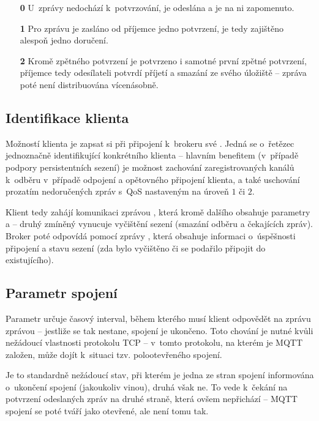 \begin{enumerate}
    \item[\textbf{0}] U~zprávy nedochází k~potvrzování, je odeslána a je na ni zapomenuto.
    \item[\textbf{1}] Pro zprávu je zasláno od příjemce jedno potvrzení, je tedy zajištěno alespoň jedno doručení.
    \item[\textbf{2}] Kromě zpětného potvrzení je potvrzeno i samotné první zpětné potvrzení, příjemce tedy
    odesílateli potvrdí příjetí a smazání ze svého úložiště -- zpráva poté není distribuována vícenásobně.
\end{enumerate}

\subsection{Identifikace klienta }\label{subsec:identifikace-klienta-client-id}
Možností klienta je zapsat si při připojení k~brokeru své .
Jedná se o~řetězec jednoznačně identifikující konkrétního klienta -- hlavním benefitem (v~případě podpory
persistentních sezení) je možnost zachování zaregistrovaných kanálů k~odběru v~případě odpojení a
opětovného připojení klienta, a také uschování prozatím nedoručených zpráv s~QoS nastaveným na úroveň $1$ či $2$.

Klient tedy zahájí komunikaci zprávou , která kromě dalšího obsahuje parametry  a  -- druhý zmíněný vynucuje vyčištění sezení (smazání odběru a čekajících zpráv).
Broker poté odpovídá pomocí zprávy , která obsahuje informaci o~úspěšnosti připojení a stavu sezení (zda
bylo vyčištěno či se podařilo připojit do existujícího).

\subsection{Parametr spojení }\label{subsec:parametr-spojeni-keep-alive}
Parametr  určuje časový interval, během kterého musí klient odpovědět na zprávu  zprávou
 -- jestliže se tak nestane, spojení je ukončeno.
Toto chování je nutné kvůli nežádoucí vlastnosti protokolu TCP --
v~tomto protokolu, na kterém je MQTT založen, může dojít k~situaci tzv. polootevřeného spojení.

Je to standardně nežádoucí stav, při kterém je jedna ze stran spojení informována o~ukončení spojení (jakoukoliv
vinou), druhá však ne.
To vede k~čekání na potvrzení odeslaných zpráv na druhé straně, která ovšem nepřichází -- MQTT spojení se poté
tváří jako otevřené, ale není tomu tak.

